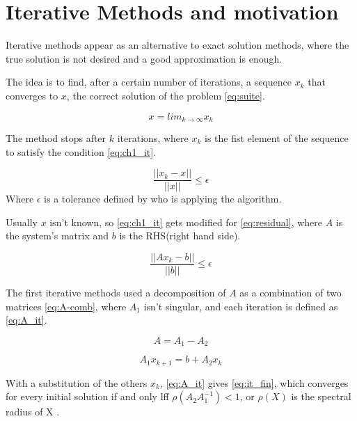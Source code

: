 \section{Iterative Methods and motivation}
    
    Iterative methods appear as an alternative to exact solution methods, where the true solution is not desired and a good approximation is enough.


    
    The idea is to find, after a certain number of iterations, a sequence ${x_{k}}$ that converges to $x$, the correct solution of the problem \ref{eq:suite}.


    \begin{equation}\label{eq:suite}
        x = lim_{k \to \infty} x_{k}
    \end{equation}

    
    The method stops after $k$ iterations, where $x_{k}$ is the fist element of the sequence to satisfy the condition \ref{eq:ch1_it}.


    \begin{equation}\label{eq:ch1_it}
       \frac{||x_{k} - x||}{||x||} \leq \epsilon
    \end{equation}
    Where $\epsilon$ is a tolerance defined by who is applying the algorithm.

    Usually $x$ isn't known, so \ref{eq:ch1_it} gets modified for \ref{eq:residual}, where $A$ is the system's matrix and $b$ is the RHS(right hand side).

    \begin{equation}\label{eq:residual}
        \frac{||Ax_{k} - b||}{||b||} \leq \epsilon
    \end{equation}

    The first iterative methods used a decomposition of $A$ as a combination of two matrices \ref{eq:A-comb}, where $A_{1}$ isn't singular, and each iteration is defined as \ref{eq:A_it}.
    
    \begin{equation}\label{eq:A-comb}
        A = A_{1} - A_{2}
    \end{equation}

    \begin{equation}\label{eq:A_it}
        A_{1} x_{k+1} = b + A_{2}x_{k}
    \end{equation}

    With a substitution of the others $x_{k}$, \ref{eq:A_it} gives \ref{eq:it_fin}, which converges for every initial solution if and only lff $\rho(A_{2}A_{1}^{-1}) < 1$, or $\rho(X)$ is the spectral radius of X \cite{bonnet}.

